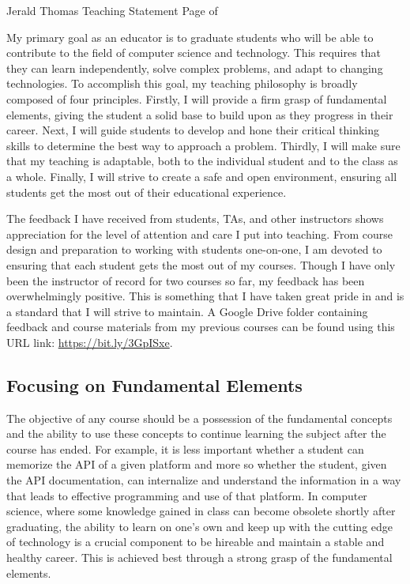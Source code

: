 \newpage

\setcounter{page}{1}
\makecvfooter
  {Jerald Thomas}
  {Teaching Statement}
  {Page \thepage \hspace{1pt} of \pageref{teaching_last}}


\makecvheader[C]
\doublespacing


My primary goal as an educator is to graduate students who will be able to contribute to the field of computer science and technology. This requires that they can learn independently, solve complex problems, and adapt to changing technologies. To accomplish this goal, my teaching philosophy is broadly composed of four principles. Firstly, I will provide a firm grasp of fundamental elements, giving the student a solid base to build upon as they progress in their career. Next, I will guide students to develop and hone their critical thinking skills to determine the best way to approach a problem. Thirdly, I will make sure that my teaching is adaptable, both to the individual student and to the class as a whole. Finally, I will strive to create a safe and open environment, ensuring all students get the most out of their educational experience.

The feedback I have received from students, TAs, and other instructors shows appreciation for the level of attention and care I put into teaching. From course design and preparation to working with students one-on-one, I am devoted to ensuring that each student gets the most out of my courses. Though I have only been the instructor of record for two courses so far, my feedback has been overwhelmingly positive. This is something that I have taken great pride in and is a standard that I will strive to maintain. A Google Drive folder containing feedback and course materials from my previous courses can be found using this URL link: \url{https://bit.ly/3GpISxe}.

\subsection*{Focusing on Fundamental Elements}
\vspace{-0.5cm}
The objective of any course should be a possession of the fundamental concepts and the ability to use these concepts to continue learning the subject after the course has ended. For example, it is less important whether a student can memorize the API of a given platform and more so whether the student, given the API documentation, can internalize and understand the information in a way that leads to effective programming and use of that platform. In computer science, where some knowledge gained in class can become obsolete shortly after graduating, the ability to learn on one's own and keep up with the cutting edge of technology is a crucial component to be hireable and maintain a stable and healthy career. This is achieved best through a strong grasp of the fundamental elements.

